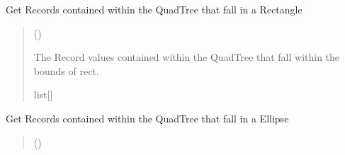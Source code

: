 \documentclass[letterpaper,10pt,english]{sphinxmanual}
\begin{document}
\begin{fulllineitems}
\begin{fulllineitems}
\begin{quote}
\begin{description}
\end{description}\end{quote}

\end{fulllineitems}


\begin{fulllineitems}
\label{\detokenize{quadtree:GeoSpatialTools.quadtree.QuadTree.query}}
\pysigstartsignatures
\pysiglinewithargsret
{}
{\sphinxparamcomma {}}
{}
\pysigstopsignatures
\sphinxAtStartPar
Get Records contained within the QuadTree that fall in a
Rectangle
\begin{quote}\begin{description}
\sphinxAtStartPar
{} ({\hyperref[\detokenize{shape:GeoSpatialTools.shape.Rectangle}]{}})

\sphinxAtStartPar
The Record values contained within the QuadTree that fall
within the bounds of rect.

\sphinxAtStartPar
list{[}{\hyperref[\detokenize{record:GeoSpatialTools.record.Record}]{}}{]}

\end{description}\end{quote}

\end{fulllineitems}


\begin{fulllineitems}
\label{\detokenize{quadtree:GeoSpatialTools.quadtree.QuadTree.query_ellipse}}
\pysigstartsignatures
\pysiglinewithargsret
{}
{\sphinxparamcomma {}}
{}
\pysigstopsignatures
\sphinxAtStartPar
Get Records contained within the QuadTree that fall in a
Ellipse
\begin{quote}\begin{description}
\sphinxAtStartPar
{} ({\hyperref[\detokenize{shape:GeoSpatialTools.shape.Ellipse}]{}})


\end{description}
\end{quote}
\end{fulllineitems}
\end{fulllineitems}
\end{document}
